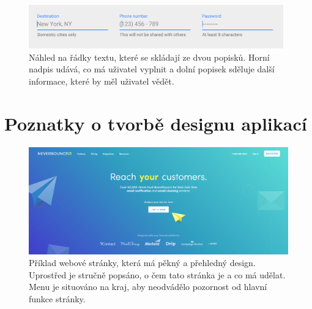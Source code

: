 \begin{figure}[H]
\centering
\includegraphics[width= 11cm]{obrazky-figures/description}
\caption{Náhled na řádky textu, které se skládají ze dvou popisků. Horní nadpis udává, co má uživatel vyplnit a dolní popisek sděluje další informace, které by měl uživatel vědět.}
\label{desc}
\end{figure}

\section{Poznatky o tvorbě designu aplikací}

\begin{figure}[H]
\centering
\includegraphics[width= 15cm]{obrazky-figures/good_design}
\caption{Příklad webové stránky, která má pěkný a přehledný design. Uprostřed je stručně popsáno, o čem tato stránka je a co má udělat. Menu je situováno na kraj, aby neodvádělo pozornost od hlavní funkce stránky.}
\label{good}
\end{figure}

